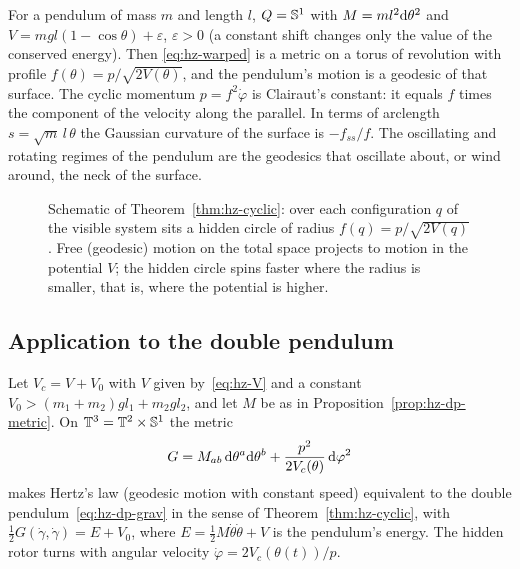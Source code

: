 \begin{example}\label{ex:hz-simple}
For a pendulum of mass $m$ and length $l$, $Q=\mathbb{S}^1$ with $M=ml^2\mathrm{d}\theta^2$ and
$V=mgl(1-\cos\theta)+\varepsilon$, $\varepsilon>0$ (a constant shift changes only
the value of the conserved energy). Then \eqref{eq:hz-warped} is a metric on a
torus of revolution with profile $f(\theta)=p/\sqrt{2V(\theta)}$,
and the pendulum's motion is a geodesic of that surface. The cyclic
momentum $p=f^2\dot\varphi$ is Clairaut's constant: it equals $f$ times the
component of the velocity along the parallel. In terms of arclength
$s=\sqrt m\,l\,\theta$ the Gaussian curvature of the surface is $-f_{ss}/f$.
The oscillating and rotating regimes of the pendulum are the geodesics that
oscillate about, or wind around, the neck of the surface.
\end{example}

\begin{figure}[t]
\centering
{}
\caption{Schematic of Theorem~\ref{thm:hz-cyclic}: over each configuration
$q$ of the visible system sits a hidden circle of radius $f(q)=p/\sqrt{2V(q)}$.
Free (geodesic) motion on the total space projects to motion in the potential
$V$; the hidden circle spins faster where the radius is smaller, that is,
where the potential is higher.}
\label{fig:hz-warped}
\end{figure}

\subsection{Application to the double pendulum}

\begin{corollary}\label{cor:hz-dp}
Let $V_c=V+V_0$ with $V$ given by~\eqref{eq:hz-V} and a constant
$V_0>(m_1+m_2)gl_1+m_2gl_2$, and let $M$ be as in
Proposition~\ref{prop:hz-dp-metric}. On $\mathbb{T}^3=\mathbb{T}^2\times\mathbb{S}^1$ the metric
\[
  G=M_{ab}\,\mathrm{d}\theta^a\mathrm{d}\theta^b+\frac{p^2}{2V_c(\theta)}\,\mathrm{d}\varphi^2
\]
makes Hertz's law (geodesic motion with constant speed) equivalent to the
double pendulum~\eqref{eq:hz-dp-grav} in the sense of
Theorem~\ref{thm:hz-cyclic}, with $\tfrac12G(\dot\gamma,\dot\gamma)=E+V_0$,
where $E=\tfrac12M\dot\theta\dot\theta+V$ is the pendulum's energy.
The hidden rotor turns with angular velocity
$\dot\varphi=2V_c(\theta(t))/p$.
\end{corollary}

